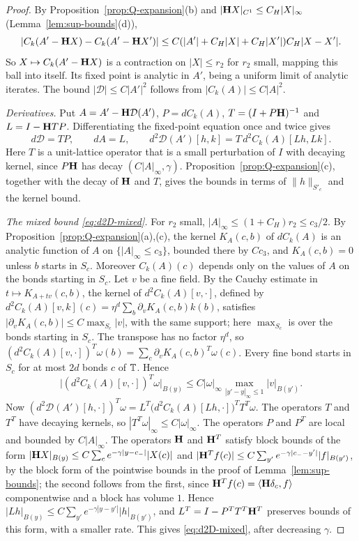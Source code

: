 \begin{proof}
By Proposition~\ref{prop:Q-expansion}(b) and $|\mathbf H X|_{C^1}\le C_H|X|_\infty$ (Lemma~\ref{lem:sup-bounds}(d)),
\[
|C_k(A'-\mathbf H X)-C_k(A'-\mathbf H X')|\le C(|A'|+C_H|X|+C_H|X'|)C_H|X-X'|.
\]
So $X\mapsto C_k(A'-\mathbf H X)$ is a contraction on $|X|\le r_2$ for $r_2$ small, mapping this ball into itself. Its fixed point is analytic in $A'$, being a uniform limit of analytic iterates. The bound $|\mathcal D|\le C|A'|^2$ follows from $|C_k(A)|\le C|A|^2$.

\emph{Derivatives.} Put $A=A'-\mathbf H\mathcal D(A')$, $P=dC_k(A)$, $T=(I+P\mathbf H)^{-1}$ and $L=I-\mathbf H TP$. Differentiating the fixed-point equation once and twice gives
\[
d\mathcal D=TP,\qquad dA=L,\qquad d^2\mathcal D(A')[h,k]=T\,d^2C_k(A)[Lh,Lk].
\]
Here $T$ is a unit-lattice operator that is a small perturbation of $I$ with decaying kernel, since $P\mathbf H$ has decay $(C|A|_\infty,\gamma)$. Proposition~\ref{prop:Q-expansion}(c), together with the decay of $\mathbf H$ and $T$, gives the bounds in terms of $\|h\|_{S'_c}$ and the kernel bound.

\emph{The mixed bound \eqref{eq:d2D-mixed}.} For $r_2$ small, $|A|_\infty\le(1+C_H)r_2\le c_3/2$. By Proposition~\ref{prop:Q-expansion}(a),(c), the kernel $K_A(c,b)$ of $dC_k(A)$ is an analytic function of $A$ on $\{|A|_\infty\le c_3\}$, bounded there by $Cc_3$, and $K_A(c,b)=0$ unless $b$ starts in $S_c$. Moreover $C_k(A)(c)$ depends only on the values of $A$ on the bonds starting in $S_c$. Let $v$ be a fine field. By the Cauchy estimate in $t\mapsto K_{A+tv}(c,b)$, the kernel of $d^2C_k(A)[v,\cdot]$, defined by $d^2C_k(A)[v,k](c)=\eta^d\sum_b\partial_vK_A(c,b)k(b)$, satisfies $|\partial_vK_A(c,b)|\le C\max_{S_c}|v|$, with the same support; here $\max_{S_c}$ is over the bonds starting in $S_c$. The transpose has no factor $\eta^d$, so $(d^2C_k(A)[v,\cdot])^T\omega(b)=\sum_c\partial_vK_A(c,b)^T\omega(c)$. Every fine bond starts in $S_c$ for at most $2d$ bonds $c$ of $\mathbb T$. Hence
\[
\big|(d^2C_k(A)[v,\cdot])^T\omega\big|_{B(y)}\le C|\omega|_\infty\max_{|y'-y|_\infty\le1}|v|_{B(y')} .
\]
Now $(d^2\mathcal D(A')[h,\cdot])^T\omega=L^T\big(d^2C_k(A)[Lh,\cdot]\big)^TT^T\omega$. The operators $T$ and $T^T$ have decaying kernels, so $|T^T\omega|_\infty\le C|\omega|_\infty$. The operators $P$ and $P^T$ are local and bounded by $C|A|_\infty$. The operators $\mathbf H$ and $\mathbf H^T$ satisfy block bounds of the form $|\mathbf H X|_{B(y)}\le C\sum_{c}e^{-\gamma|y-c_-|}|X(c)|$ and $|\mathbf H^Tf(c)|\le C\sum_{y'}e^{-\gamma|c_--y'|}|f|_{B(y')}$, by the block form of the pointwise bounds in the proof of Lemma~\ref{lem:sup-bounds}; the second follows from the first, since $\mathbf H^Tf(c)=\langle \mathbf H\delta_c,f\rangle$ componentwise and a block has volume $1$. Hence $|Lh|_{B(y)}\le C\sum_{y'}e^{-\gamma|y-y'|}|h|_{B(y')}$, and $L^T=I-P^TT^T\mathbf H^T$ preserves bounds of this form, with a smaller rate. This gives \eqref{eq:d2D-mixed}, after decreasing $\gamma$.


\end{proof}
